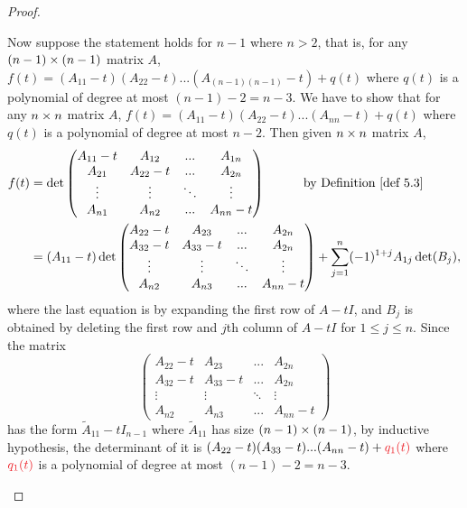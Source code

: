 \begin{proof}
\begin{enumerate}
Now suppose the statement holds for \(n - 1\) where \(n > 2\), that is,
for any \((n - 1) \times (n - 1)\) matrix \(A\), \(f(t) = (A_{11} - t)(A_{22} - t) ... (A_{(n - 1)(n - 1)} - t) + q(t)\) where \(q(t)\) is a polynomial of degree at most \((n - 1) - 2 = n - 3\).
We have to show that for any \(n \times n\) matrix \(A\), \(f(t) = (A_{11} - t)(A_{22} - t) ... (A_{nn} - t) + q(t)\) where \(q(t)\) is a polynomial of degree at most \(n - 2\).
Then given \(n \times n\) matrix \(A\),
\begin{align*}
    f(t) & = \det \begin{pmatrix}
        A_{11} - t & A_{12}     & ...        & A_{1n} \\
        A_{21}     & A_{22} - t & ...        & A_{2n} \\
        \vdots     & \vdots     & \ddots     & \vdots \\
        A_{n1}     & A_{n2}     & ...        & A_{nn} - t
    \end{pmatrix} \quad \quad \quad \text{by \DEF{5.3}} \\
    & = (A_{11} - t) \det \begin{pmatrix}
        A_{22} - t & A_{23}     & ...    & A_{2n} \\
        A_{32} - t & A_{33} - t & ...    & A_{2n} \\
        \vdots     & \vdots     & \ddots & \vdots \\
        A_{n2}     & A_{n3}     & ...    & A_{nn} - t
    \end{pmatrix}
    + \sum_{j = 1}^n (-1)^{1 + j} A_{1j} \det(B_j),
\end{align*}
where the last equation is by expanding the first row of \(A - tI\), and \(B_j\) is obtained by deleting the first row and \(j\)th column of \(A - tI\) for \(1 \le j \le n\).
Since the matrix
\[
    \begin{pmatrix}
        A_{22} - t & A_{23}     & ...    & A_{2n} \\
        A_{32} - t & A_{33} - t & ...    & A_{2n} \\
        \vdots     & \vdots     & \ddots & \vdots \\
        A_{n2}     & A_{n3}     & ...    & A_{nn} - t
    \end{pmatrix}
\]
has the form \(\tilde{A}_{11} - t I_{n - 1}\) where \(\tilde{A}_{11}\) has size \((n - 1) \times (n - 1)\),
by inductive hypothesis, the determinant of it is \((A_{22} - t)(A_{33} - t) ... (A_{nn} - t) + \RED{q_1(t)}\) where \(\RED{q_1(t)}\) is a polynomial of degree at most \((n - 1) - 2 = n - 3\).

\end{enumerate}
\end{proof}
